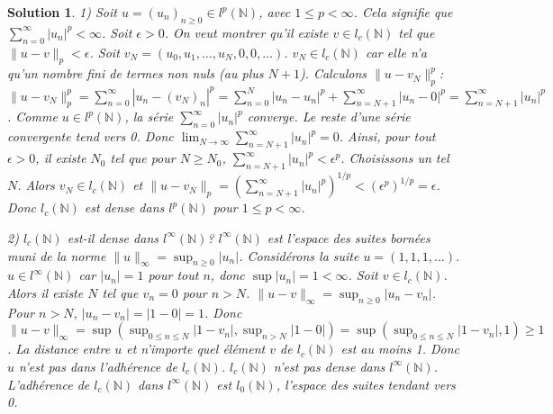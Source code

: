 \documentclass{article}
\newtheorem{solution}{Solution}
\begin{document}
\begin{solution}
1) Soit $u = (u_n)_{n \ge 0} \in l^p(\mathbb{N})$, avec $1 \le p < \infty$. Cela signifie que $\sum_{n=0}^\infty |u_n|^p < \infty$.
Soit $\epsilon > 0$.
On veut montrer qu'il existe $v \in l_c(\mathbb{N})$ tel que $\|u-v\|_p < \epsilon$.
Soit $v_N = (u_0, u_1, \dots, u_N, 0, 0, \dots)$. $v_N \in l_c(\mathbb{N})$ car elle n'a qu'un nombre fini de termes non nuls (au plus $N+1$).
Calculons $\|u-v_N\|_p^p$:
$\|u-v_N\|_p^p = \sum_{n=0}^\infty |u_n - (v_N)_n|^p = \sum_{n=0}^N |u_n - u_n|^p + \sum_{n=N+1}^\infty |u_n - 0|^p = \sum_{n=N+1}^\infty |u_n|^p$.
Comme $u \in l^p(\mathbb{N})$, la série $\sum_{n=0}^\infty |u_n|^p$ converge.
Le reste d'une série convergente tend vers 0. Donc $\lim_{N \to \infty} \sum_{n=N+1}^\infty |u_n|^p = 0$.
Ainsi, pour tout $\epsilon > 0$, il existe $N_0$ tel que pour $N \ge N_0$, $\sum_{n=N+1}^\infty |u_n|^p < \epsilon^p$.
Choisissons un tel $N$. Alors $v_N \in l_c(\mathbb{N})$ et $\|u - v_N\|_p = (\sum_{n=N+1}^\infty |u_n|^p)^{1/p} < (\epsilon^p)^{1/p} = \epsilon$.
Donc $l_c(\mathbb{N})$ est dense dans $l^p(\mathbb{N})$ pour $1 \le p < \infty$.

2) $l_c(\mathbb{N})$ est-il dense dans $l^\infty(\mathbb{N})$?
$l^\infty(\mathbb{N})$ est l'espace des suites bornées muni de la norme $\|u\|_\infty = \sup_{n \ge 0} |u_n|$.
Considérons la suite $u = (1, 1, 1, \dots)$. $u \in l^\infty(\mathbb{N})$ car $|u_n|=1$ pour tout $n$, donc $\sup |u_n| = 1 < \infty$.
Soit $v \in l_c(\mathbb{N})$. Alors il existe $N$ tel que $v_n = 0$ pour $n > N$.
$\|u - v\|_\infty = \sup_{n \ge 0} |u_n - v_n|$.
Pour $n > N$, $|u_n - v_n| = |1 - 0| = 1$.
Donc $\|u - v\|_\infty = \sup (\sup_{0 \le n \le N} |1-v_n|, \sup_{n > N} |1-0|) = \sup (\sup_{0 \le n \le N} |1-v_n|, 1) \ge 1$.
La distance entre $u$ et n'importe quel élément $v$ de $l_c(\mathbb{N})$ est au moins 1.
Donc $u$ n'est pas dans l'adhérence de $l_c(\mathbb{N})$.
$l_c(\mathbb{N})$ n'est pas dense dans $l^\infty(\mathbb{N})$. L'adhérence de $l_c(\mathbb{N})$ dans $l^\infty(\mathbb{N})$ est $l_0(\mathbb{N})$, l'espace des suites tendant vers 0.


\end{solution}
\end{document}
